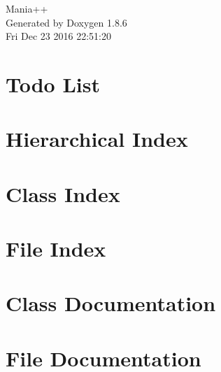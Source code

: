 \documentclass[twoside]{book}
\newcommand{\clearemptydoublepage}{%
  \newpage{\pagestyle{empty}\cleardoublepage}%
}
\begin{document}
\hypersetup{pageanchor=false}
\begin{titlepage}
\vspace*{7cm}
\begin{center}%
{\Large Mania++ }\\
\vspace*{1cm}
{\large Generated by Doxygen 1.8.6}\\
\vspace*{0.5cm}
{\small Fri Dec 23 2016 22:51:20}\\
\end{center}
\end{titlepage}
\clearemptydoublepage
\tableofcontents
\clearemptydoublepage
{}
\hypersetup{pageanchor=true}

\chapter{Todo List}
\label{todo}
\hypertarget{todo}{}

\chapter{Hierarchical Index}

\chapter{Class Index}

\chapter{File Index}

\chapter{Class Documentation}



















\chapter{File Documentation}

























\newpage
{}
{}
\printindex
\end{document}
